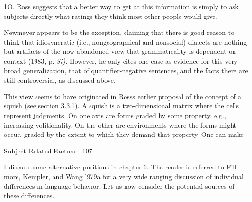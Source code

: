 \begin{styleStandard}
1O. Ross suggests that a better way to get at this information is simply to ask subjects directly what ratings they think most other people would give.
\end{styleStandard}


\begin{listWWNumxlileveli}
\item 
\setcounter{listWWNumxlilevelii}{10}
\begin{listWWNumxlilevelii}
\item 
\begin{styleStandard}
Newmeyer appears to be the exception, claiming that {\textquotedbl}there is good reason to think that idiosyncratic (i.e., nongeographical and nonsocial) dialects are nothing but artifacts of the now\- abandoned view that grammaticality is dependent on context{\textquotedbl} (1983, p. \textit{Si).}\textit{ }However, he only cites one case as evidence for this very broad generalization, that of quantifier-negative sentences, and the facts there are still controversial, as discussed above.
\end{styleStandard}


\item 
\begin{styleStandard}
This view seems to have originated in Ross{\textquotesingle}s earlier proposal of the concept of a squish (see section 3.3.1). A squish is a two-dimensional matrix where the cells represent judgments. On one axis are forms graded by some property, e.g., increasing volitionality. On the other are environments where the forms might occur, graded by the extent to which they demand that property. One can make
\end{styleStandard}


\end{listWWNumxlilevelii}
\end{listWWNumxlileveli}
\clearpage\setcounter{page}{1}\begin{styleStandard}
Subject-Related Factors\ \ 107
\end{styleStandard}


\begin{styleStandard}
I discuss some alternative positions in chapter 6. The reader is referred to Fill\- more, Kempler, and Wang l979a for a very wide ranging discussion of individual differences in language behavior. Let us now consider the potential sources of these differences.
\end{styleStandard}


